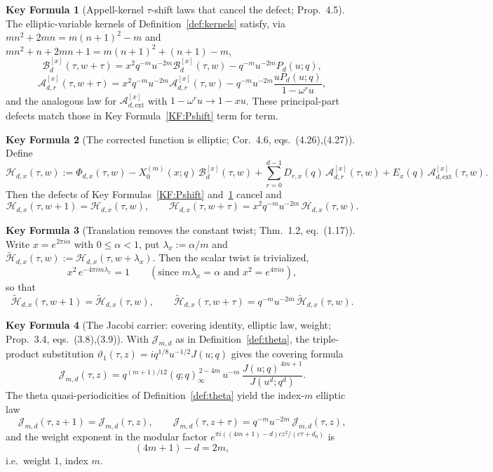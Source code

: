 \documentclass[11pt]{article}
\newcommand{\JJ}{\mathcal{J}}
\theoremstyle{definition}
\newtheorem{keyformula}{Key Formula}
\begin{document}
\begin{keyformula}[Appell-kernel $\tau$-shift laws that cancel the defect; Prop.~4.5]\label{KF:appellshift}
The elliptic-variable kernels of Definition~\ref{def:kernels} satisfy, via
$mn^2+2mn=m(n+1)^2-m$ and $mn^2+n+2mn+1=m(n+1)^2+(n+1)-m$,
\[
\mathcal B_d^{[x]}(\tau,w+\tau)=x^2q^{-m}u^{-2m}\mathcal B_d^{[x]}(\tau,w)-q^{-m}u^{-2m}P_d(u;q),
\]
\[
\mathcal A_{d,r}^{[x]}(\tau,w+\tau)=x^2q^{-m}u^{-2m}\mathcal A_{d,r}^{[x]}(\tau,w)
-q^{-m}u^{-2m}\frac{uP_d(u;q)}{1-\omega^ru},
\]
and the analogous law for $\mathcal A_{d,\mathrm{ext}}^{[x]}$ with $1-\omega^ru\to1-xu$.
These principal-part defects match those in Key Formula~\ref{KF:Pshift} term for term.
\end{keyformula}

\begin{keyformula}[The corrected function is elliptic; Cor.~4.6, eqs.~(4.26),(4.27)]\label{KF:corrected}
Define
\[
\mathcal H_{d,x}(\tau,w):=\Phi_{d,x}(\tau,w)
-X_0^{(m)}(x;q)\,\mathcal B_d^{[x]}(\tau,w)
+\sum_{r=0}^{d-1}D_{r,x}(q)\,\mathcal A_{d,r}^{[x]}(\tau,w)
+E_x(q)\,\mathcal A_{d,\mathrm{ext}}^{[x]}(\tau,w).
\]
Then the defects of Key Formulas~\ref{KF:Pshift} and~\ref{KF:appellshift} cancel and
\[
\mathcal H_{d,x}(\tau,w+1)=\mathcal H_{d,x}(\tau,w),
\qquad
\mathcal H_{d,x}(\tau,w+\tau)=x^2q^{-m}u^{-2m}\,\mathcal H_{d,x}(\tau,w).
\]
\end{keyformula}

\begin{keyformula}[Translation removes the constant twist; Thm.~1.2, eq.~(1.17)]\label{KF:untwist}
Write $x=e^{2\pi i\alpha}$ with $0\le\alpha<1$, put $\lambda_x:=\alpha/m$ and
$\widetilde{\mathcal H}_{d,x}(\tau,w):=\mathcal H_{d,x}(\tau,w+\lambda_x)$. Then the scalar twist
is trivialized,
\[
x^2\,e^{-4\pi i m\lambda_x}=1
\qquad(\text{since } m\lambda_x=\alpha \text{ and } x^2=e^{4\pi i\alpha}),
\]
so that
\[
\widetilde{\mathcal H}_{d,x}(\tau,w+1)=\widetilde{\mathcal H}_{d,x}(\tau,w),
\qquad
\widetilde{\mathcal H}_{d,x}(\tau,w+\tau)=q^{-m}u^{-2m}\,\widetilde{\mathcal H}_{d,x}(\tau,w).
\]
\end{keyformula}

\begin{keyformula}[The Jacobi carrier: covering identity, elliptic law, weight; Prop.~3.4, eqs.~(3.8),(3.9)]\label{KF:carrier}
With $\JJ_{m,d}$ as in Definition~\ref{def:theta}, the triple-product substitution
$\vartheta_1(\tau,z)=iq^{1/8}u^{-1/2}J(u;q)$ gives the covering formula
\[
\JJ_{m,d}(\tau,z)=q^{(m+1)/12}(q;q)_\infty^{\,2-4m}\,u^{-m}\,\frac{J(u;q)^{\,4m+1}}{J(u^d;q^d)}.
\]
The theta quasi-periodicities of Definition~\ref{def:theta} yield the index-$m$ elliptic law
\[
\JJ_{m,d}(\tau,z+1)=\JJ_{m,d}(\tau,z),
\qquad
\JJ_{m,d}(\tau,z+\tau)=q^{-m}u^{-2m}\,\JJ_{m,d}(\tau,z),
\]
and the weight exponent in the modular factor $e^{\pi i((4m+1)-d)cz^2/(c\tau+d_0)}$ is
\[
(4m+1)-d=2m,
\]
i.e.\ weight $1$, index $m$.
\end{keyformula}
\end{document}
